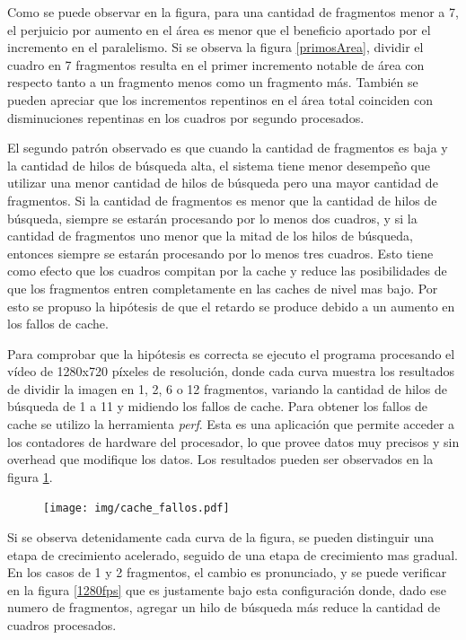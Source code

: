 Como se puede observar en la figura, para una cantidad de fragmentos menor a 7,
el perjuicio por aumento en el área es menor que el beneficio aportado por el
incremento en el paralelismo. Si se observa la figura \ref{primosArea}, dividir
el cuadro en 7 fragmentos resulta en el primer incremento notable de área con
respecto tanto a un fragmento menos como un fragmento más. También se pueden
apreciar que los incrementos repentinos en el área total coinciden con
disminuciones repentinas en los cuadros por segundo procesados.

El segundo patrón observado es que cuando la cantidad de fragmentos es baja y la
cantidad de hilos de búsqueda alta, el sistema tiene menor desempeño que
utilizar una menor cantidad de hilos de búsqueda pero una mayor cantidad de
fragmentos. Si la cantidad de fragmentos es menor que la cantidad de hilos de
búsqueda, siempre se estarán procesando por lo menos dos cuadros, y si la
cantidad de fragmentos uno menor que la mitad de los hilos de búsqueda, entonces
siempre se estarán procesando por lo menos tres cuadros. Esto tiene como efecto
que los cuadros compitan por la cache y reduce las posibilidades de que los
fragmentos entren completamente en las caches de nivel mas bajo. Por esto se
propuso la hipótesis de que el retardo se produce debido a un aumento en los
fallos de cache.

Para comprobar que la hipótesis es correcta se ejecuto el programa procesando el
vídeo de 1280x720 píxeles de resolución, donde cada curva muestra los resultados
de dividir la imagen en 1, 2, 6 o 12 fragmentos, variando la cantidad de hilos
de búsqueda de 1 a 11 y midiendo los fallos de cache. Para obtener los fallos de
cache se utilizo la herramienta \emph{perf}. Esta es una aplicación que permite
acceder a los contadores de hardware del procesador, lo que provee datos muy
precisos y sin overhead que modifique los datos. Los resultados pueden ser
observados en la figura \ref{cacheFallos}.

\begin{figure}[!h]

	\texttt{[image: img/cache\_fallos.pdf]}
	\caption{}
	\label{cacheFallos}

\end{figure}

Si se observa detenidamente cada curva de la figura, se pueden distinguir una
etapa de crecimiento acelerado, seguido de una etapa de crecimiento mas gradual.
En los casos de 1 y 2 fragmentos, el cambio es pronunciado, y se puede verificar
en la figura \ref{1280fps} que es justamente bajo esta configuración donde, dado
ese numero de fragmentos, agregar un hilo de búsqueda más reduce la cantidad de
cuadros procesados.


